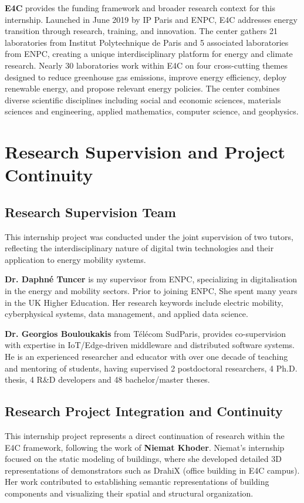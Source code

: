 \textbf{E4C} provides the funding framework and broader research context for this internship. Launched in June 2019 by IP Paris and ENPC, E4C addresses energy transition through research, training, and innovation. The center gathers 21 laboratories from Institut Polytechnique de Paris and 5 associated laboratories from ENPC, creating a unique interdisciplinary platform for energy and climate research.
Nearly 30 laboratories work within E4C on four cross-cutting themes designed to reduce greenhouse gas emissions, improve energy efficiency, deploy renewable energy, and propose relevant energy policies. The center combines diverse scientific disciplines including social and economic sciences, materials sciences and engineering, applied mathematics, computer science, and geophysics.

\section{Research Supervision and Project Continuity}

\subsection{Research Supervision Team}

This internship project was conducted under the joint supervision of two tutors, 
reflecting the interdisciplinary nature of digital twin technologies and their 
application to energy mobility systems.

\textbf{Dr. Daphné Tuncer} is my supervisor from ENPC, specializing in 
digitalisation in the energy and mobility sectors.  Prior to joining ENPC, She spent many years in the UK Higher Education. Her research keywords include electric mobility, cyberphysical systems, data management, and applied data science.

\textbf{Dr. Georgios Bouloukakis} from Télécom SudParis, provides co-supervision with expertise in IoT/Edge-driven middleware and distributed software 
systems. He is an experienced researcher and educator with over one decade of teaching and mentoring of students, having supervised 2 postdoctoral researchers, 4 Ph.D. thesis, 4 R\&D developers and 48 bachelor/master theses. 

\subsection{Research Project Integration and Continuity}

This internship project represents a direct continuation of research within the E4C framework, 
following the work of \textbf{Niemat Khoder}. Niemat's internship focused on the 
static modeling of buildings, where she developed detailed 3D representations 
of demonstrators such as DrahiX (office building in E4C campus). Her work contributed to establishing semantic 
representations of building components and visualizing their spatial and structural organization.

